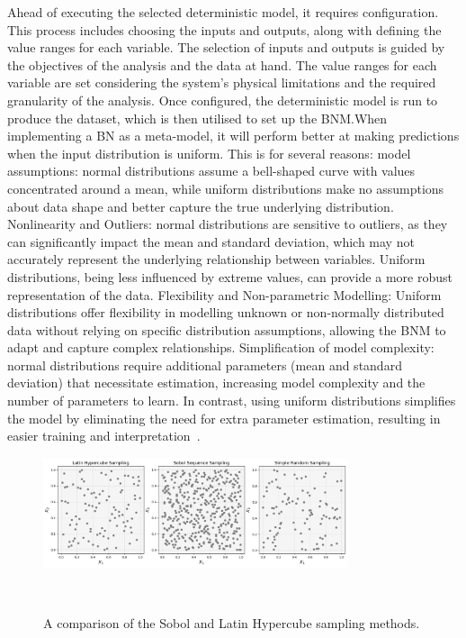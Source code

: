 \documentclass[journal]{IEEEtran}
\begin{document}
Ahead of executing the selected deterministic model, it requires configuration. This process includes choosing the inputs and outputs, along with defining the value ranges for each variable. The selection of inputs and outputs is guided by the objectives of the analysis and the data at hand. The value ranges for each variable are set considering the system's physical limitations and the required granularity of the analysis. Once configured, the deterministic model is run to produce the dataset, which is then utilised to set up the BNM.\@ When implementing a BN as a meta-model, it will perform better at making predictions when the input distribution is uniform. This is for several reasons: model assumptions: normal distributions assume a bell-shaped curve with values concentrated around a mean, while uniform distributions make no assumptions about data shape and better capture the true underlying distribution. Nonlinearity and Outliers: normal distributions are sensitive to outliers, as they can significantly impact the mean and standard deviation, which may not accurately represent the underlying relationship between variables. Uniform distributions, being less influenced by extreme values, can provide a more robust representation of the data. Flexibility and Non-parametric Modelling: Uniform distributions offer flexibility in modelling unknown or non-normally distributed data without relying on specific distribution assumptions, allowing the BNM to adapt and capture complex relationships. Simplification of model complexity: normal distributions require additional parameters (mean and standard deviation) that necessitate estimation, increasing model complexity and the number of parameters to learn. In contrast, using uniform distributions simplifies the model by eliminating the need for extra parameter estimation, resulting in easier training and interpretation~\cite{Duda1973,Neapolitan2004, Koller2009}.

\begin{figure}[t]
    \centering
    \includegraphics[width=0.8\textwidth]{figures/methodology/sobol_vs_lhs_simple.png}
    \caption{\small A comparison of the Sobol and Latin Hypercube sampling methods.}~\label{fig:sobol_vs_lhs}
\end{figure}
\end{document}
